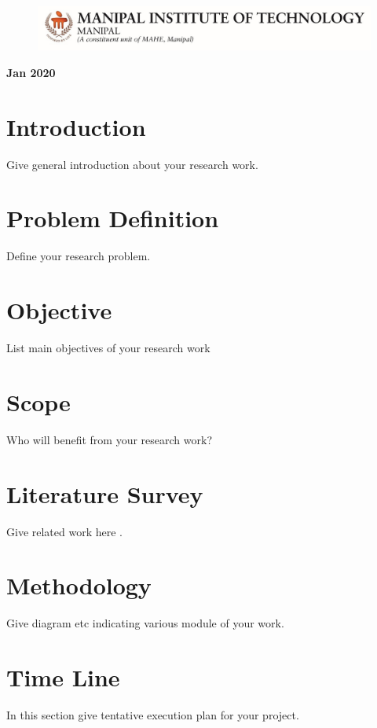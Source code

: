 \documentclass[a4paper,12pt]{article}
\begin{document}
\begin{titlepage}
	\begin{figure}[h]
  \begin{center}
	\includegraphics{MITLogo}
	\end{center}
	\end{figure}
	\begin{center}
	\textbf{Jan 2020}
	\end{center}
\end{titlepage}


\newpage
\section{Introduction}
Give general introduction about your research work.
\section{Problem Definition}	
Define your research problem.
\section{Objective}
List main objectives of your research work
\section{Scope}
Who will benefit from your research work?
\section{Literature Survey}
Give related work here \cite{sh07}\cite{odo95}\cite{gs97}.

\section{Methodology}
Give diagram etc indicating various module of your work.

\section{Time Line}
In this section give tentative execution plan for your project.




\end{document}
